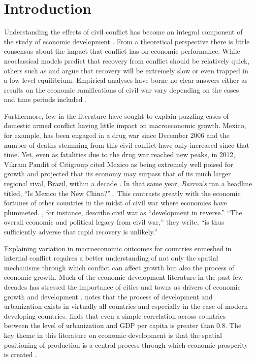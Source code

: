 
\section{Introduction}
\label{intro}

Understanding the effects of civil conflict has become an integral component of the study of economic development \citep{serneels:verpoorten:2013}. From a theoretical perspective there is little consensus about the impact that conflict has on economic performance. While neoclassical models predict that recovery from conflict should be relatively quick, others such as \citet{barro:martin:2004} and \citet{sachs:2006} argue that recovery will be extremely slow or even trapped in a low level equilibrium. Empirical analyses have borne no clear answers either as results on the economic ramifications of civil war vary depending on the cases and time periods included \citep{kang:meernik:2005}. 

Furthermore, few in the literature have sought to explain puzzling cases of domestic armed conflict having little impact on macroeconomic growth. Mexico, for example, has been engaged in a drug war since December 2006 and the number of deaths stemming from this civil conflict have only increased since that time. Yet, even as fatalities due to the drug war reached new peaks, in 2012, Vikram Pandit of Citigroup cited Mexico as being extremely well poised for growth and projected that its economy may surpass that of its much larger regional rival, Brazil, within a decade \citep{vardi:2012}. In that same year, \emph{Barron's} ran a headline titled, ``Is Mexico the New China?'' \citep{kapadia:2012}. This contrasts greatly with the economic fortunes of other countries in the midst of civil war where economies have plummeted. \citet{collier:elliott:etal:2003}, for instance, describe civil war as ``development in reverse.'' ``The overall economic and political legacy from civil war,'' they write, ``is thus sufficiently adverse that rapid recovery is unlikely.''  

Explaining variation in macroeconomic outcomes for countries enmeshed in internal conflict requires a better understanding of not only the spatial mechanisms through which conflict can affect growth but also the process of economic growth. Much of the economic development literature in the past few decades has stressed the importance of cities and towns as drivers of economic growth and development \citep{hanson:2005}. \citet{venables:2005} notes that the process of development and urbanization exists in virtually all countries and especially in the case of modern developing countries. \citet{henderson:2000} finds that even a simple correlation across countries between the level of urbanization and GDP per capita is greater than 0.8. The key theme in this literature on economic development is that the spatial positioning of production is a central process through which economic prosperity is created \citep{krugman:1991}.

